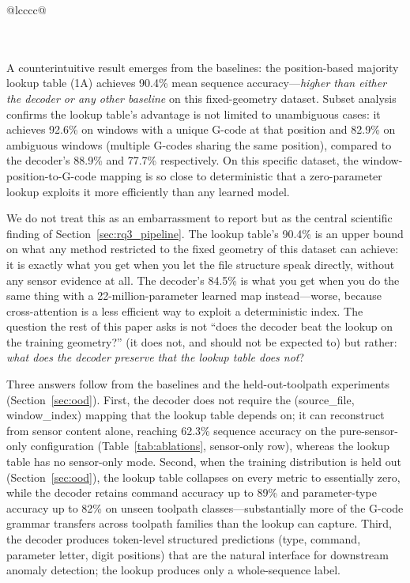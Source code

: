 \documentclass[sensors,article,submit,moreauthors,pdftex]{Definitions/mdpi}
\begin{document}
\begin{table}[htbp]
\begin{tabular}{@{}lcccc@{}}
\\
\\
\\
\end{tabular}
\normalsize
\end{table}

A counterintuitive result emerges from the baselines: the position-based majority lookup table (1A) achieves 90.4\% mean sequence accuracy---\emph{higher than either the decoder or any other baseline} on this fixed-geometry dataset. Subset analysis confirms the lookup table's advantage is not limited to unambiguous cases: it achieves 92.6\% on windows with a unique G-code at that position and 82.9\% on ambiguous windows (multiple G-codes sharing the same position), compared to the decoder's 88.9\% and 77.7\% respectively. On this specific dataset, the window-position-to-G-code mapping is so close to deterministic that a zero-parameter lookup exploits it more efficiently than any learned model.

We do not treat this as an embarrassment to report but as the central scientific finding of Section~\ref{sec:rq3_pipeline}. The lookup table's 90.4\% is an upper bound on what any method restricted to the fixed geometry of this dataset can achieve: it is exactly what you get when you let the file structure speak directly, without any sensor evidence at all. The decoder's 84.5\% is what you get when you do the same thing with a 22-million-parameter learned map instead---worse, because cross-attention is a less efficient way to exploit a deterministic index. The question the rest of this paper asks is not ``does the decoder beat the lookup on the training geometry?'' (it does not, and should not be expected to) but rather: \emph{what does the decoder preserve that the lookup table does not}?

Three answers follow from the baselines and the held-out-toolpath experiments (Section~\ref{sec:ood}). First, the decoder does not require the (source\_file, window\_index) mapping that the lookup table depends on; it can reconstruct from sensor content alone, reaching 62.3\% sequence accuracy on the pure-sensor-only configuration (Table~\ref{tab:ablations}, sensor-only row), whereas the lookup table has no sensor-only mode. Second, when the training distribution is held out (Section~\ref{sec:ood}), the lookup table collapses on every metric to essentially zero, while the decoder retains command accuracy up to 89\% and parameter-type accuracy up to 82\% on unseen toolpath classes---substantially more of the G-code grammar transfers across toolpath families than the lookup can capture. Third, the decoder produces token-level structured predictions (type, command, parameter letter, digit positions) that are the natural interface for downstream anomaly detection; the lookup produces only a whole-sequence label.
\end{document}
